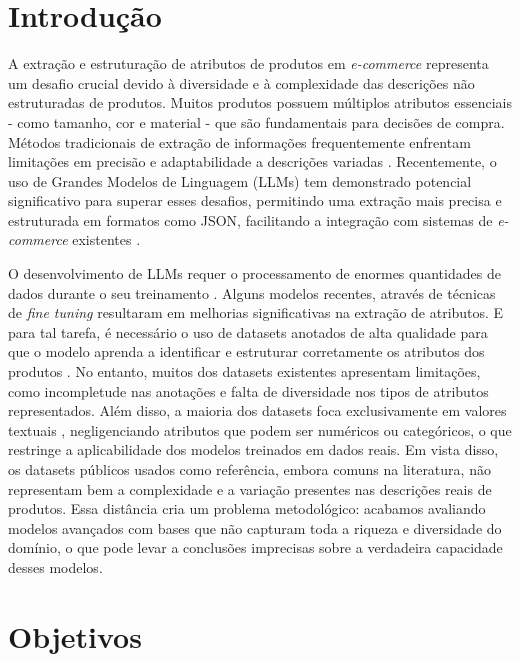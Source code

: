 \section{Introdução} %

A extração e estruturação de atributos de produtos em \textit{e-commerce} representa um desafio crucial devido à diversidade e à complexidade das descrições não estruturadas de produtos. Muitos produtos possuem múltiplos atributos essenciais - como tamanho, cor e material - que são fundamentais para decisões de compra. Métodos tradicionais de extração de informações frequentemente enfrentam limitações em precisão e adaptabilidade a descrições variadas \citet{ExtractGPT2023}. Recentemente, o uso de Grandes Modelos de Linguagem (LLMs) tem demonstrado potencial significativo para superar esses desafios, permitindo uma extração mais precisa e estruturada em formatos como JSON, facilitando a integração com sistemas de \textit{e-commerce} existentes \citet{PAE2024}.

O desenvolvimento de LLMs requer o processamento de enormes quantidades de dados durante o seu treinamento \citet{ExtractGPT2023}. Alguns modelos recentes, através de técnicas de \textit{fine tuning} resultaram em melhorias significativas na extração de atributos. E para tal tarefa, é necessário o uso de datasets anotados de alta qualidade para que o modelo aprenda a identificar e estruturar corretamente os atributos dos produtos \citet{MAVE2024}. No entanto, muitos dos datasets existentes apresentam limitações, como incompletude nas anotações e falta de diversidade nos tipos de atributos representados. Além disso, a maioria dos datasets foca exclusivamente em valores textuais \citet{MAVE2024}, negligenciando atributos que podem ser numéricos ou categóricos, o que restringe a aplicabilidade dos modelos treinados em dados reais. Em vista disso, os datasets públicos usados como referência, embora comuns na literatura, não representam bem a complexidade e a variação presentes nas descrições reais de produtos. Essa distância cria um problema metodológico: acabamos avaliando modelos avançados com bases que não capturam toda a riqueza e diversidade do domínio, o que pode levar a conclusões imprecisas sobre a verdadeira capacidade desses modelos.

\section{Objetivos} %

